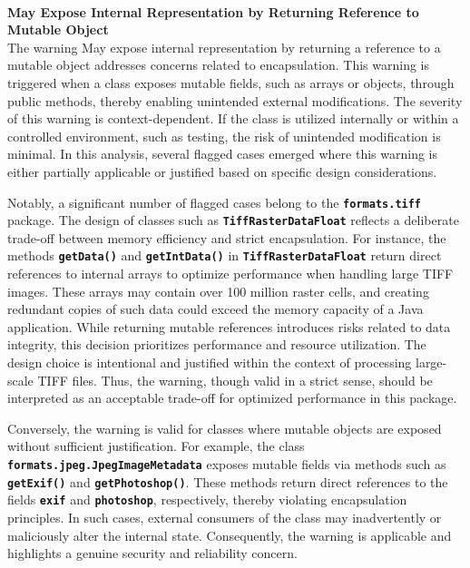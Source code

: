 \documentclass[sigconf]{acmart}
\begin{document}
{\hfill\\
{\textbf{May Expose Internal Representation by Returning Reference to Mutable Object}}
\hfill\\

The warning May expose internal representation by returning a reference to a mutable object addresses concerns related to encapsulation. This warning is triggered when a class exposes mutable fields, such as arrays or objects, through public methods, thereby enabling unintended external modifications.
The severity of this warning is context-dependent. If the class is utilized internally or within a controlled environment, such as testing, the risk of unintended modification is minimal. In this analysis, several flagged cases emerged where this warning is either partially applicable or justified based on specific design considerations.

Notably, a significant number of flagged cases belong to the \textbf{\texttt{formats.tiff}} package. The design of classes such as \textbf{\texttt{TiffRaster\allowbreak DataFloat}} reflects a deliberate trade-off between memory efficiency and strict encapsulation. For instance, the methods \textbf{\texttt{getData()}} and \textbf{\texttt{getIntData()}} in \textbf{\texttt{TiffRasterDataFloat}} return direct references to internal arrays to optimize performance when handling large TIFF images. These arrays may contain over 100 million raster cells, and creating redundant copies of such data could exceed the memory capacity of a Java application.
While returning mutable references introduces risks related to data integrity, this decision prioritizes performance and resource utilization. The design choice is intentional and justified within the context of processing large-scale TIFF files. Thus, the warning, though valid in a strict sense, should be interpreted as an acceptable trade-off for optimized performance in this package.

Conversely, the warning is valid for classes where mutable objects are exposed without sufficient justification. For example, the class \textbf{\texttt{formats.jpeg.JpegImageMetadata}} exposes mutable fields via methods such as \textbf{\texttt{getExif()}} and \textbf{\texttt{getPhotoshop()}}. These methods return direct references to the fields \textbf{\texttt{exif}} and \textbf{\texttt{photoshop}}, respectively, thereby violating encapsulation principles. In such cases, external consumers of the class may inadvertently or maliciously alter the internal state. Consequently, the warning is applicable and highlights a genuine security and reliability concern.

}
\end{document}
